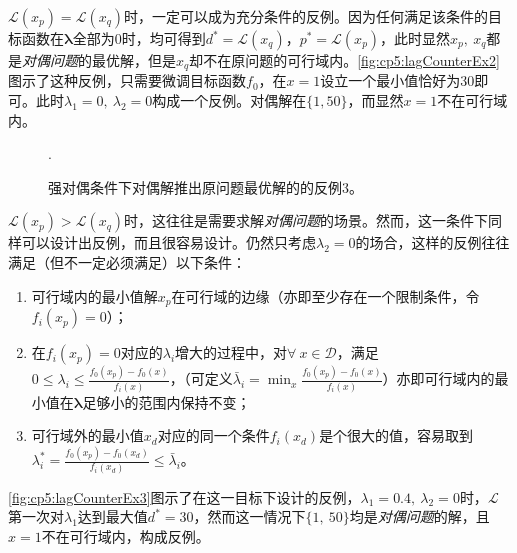 $\mathcal{L}(x_p)=\mathcal{L}(x_q)$时，一定可以成为充分条件的反例。因为任何满足该条件的目标函数在$\bm{\lambda}$全部为0时，均可得到$d^{\ast}=\mathcal{L}(x_q)$，$p^{\ast}=\mathcal{L}(x_p)$，此时显然$x_p,~x_q$都是\emph{对偶问题}的最优解，但是$x_q$却不在原问题的可行域内。\autoref{fig:cp5:lagCounterEx2}图示了这种反例，只需要微调目标函数$f_0$，在$x=1$设立一个最小值恰好为30即可。此时$\lambda_1=0,~\lambda_2=0$构成一个反例。对偶解在$\{1,50\}$，而显然$x=1$不在可行域内。

\begin{figure}[htbp]
	\centering
	\begin{minipage}[b]{0.48\textwidth}
	\end{minipage}
	\begin{minipage}[b]{0.48\textwidth}
	\end{minipage}
	\DeclareGraphicsExtensions.
	\caption{强对偶条件下对偶解推出原问题最优解的的反例3。}
	\label{fig:cp5:lagCounterEx3}
\end{figure}

$\mathcal{L}(x_p)>\mathcal{L}(x_q)$时，这往往是需要求解\emph{对偶问题}的场景。然而，这一条件下同样可以设计出反例，而且很容易设计。仍然只考虑$\lambda_2=0$的场合，这样的反例往往满足（但不一定必须满足）以下条件：

\begin{enumerate}
	\item 可行域内的最小值解$x_p$在可行域的边缘（亦即至少存在一个限制条件，令$f_i(x_p)=0$）；
	\item 在$f_i(x_p)=0$对应的$\lambda_i$增大的过程中，对$\forall~x\in\mathcal{D}$，满足$0 \leqslant \lambda_i \leqslant \frac{f_0(x_p)-f_0(x)}{f_i(x)}$，（可定义$\bar{\lambda}_i = \min_{x}{\frac{f_0(x_p)-f_0(x)}{f_i(x)}}$）亦即可行域内的最小值在$\bm{\lambda}$足够小的范围内保持不变；
	\item 可行域外的最小值$x_d$对应的同一个条件$f_i(x_d)$是个很大的值，容易取到$\lambda^{\ast}_i = \frac{f_0(x_p)-f_0(x_d)}{f_i(x_d)} \leqslant \bar{\lambda}_i$。
\end{enumerate}

\autoref{fig:cp5:lagCounterEx3}图示了在这一目标下设计的反例，$\lambda_1=0.4,~\lambda_2=0$时，$\mathcal{L}$第一次对$\lambda_1$达到最大值$d^{\ast}=30$，然而这一情况下$\{1,~50\}$均是\emph{对偶问题}的解，且$x=1$不在可行域内，构成反例。

